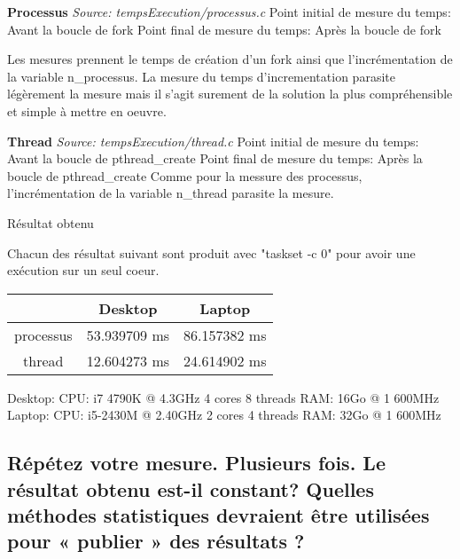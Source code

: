 \documentclass[12pt]{article}
\begin{document}
		\textbf{Processus}\newline
		\textit{Source: tempsExecution/processus.c} \newline
		Point initial de mesure du temps: Avant la boucle de fork \newline
		Point final de mesure du temps: Après la boucle de fork \newline
		\newline

		Les mesures prennent le temps de création d'un fork ainsi que l'incrémentation
		de la variable n\_processus. La mesure du temps d'incrementation parasite
		légèrement la mesure mais il s'agit surement de la solution la plus
		compréhensible et simple à mettre en oeuvre.\newline
		\newline

		\textbf{Thread}\newline
		\textit{Source: tempsExecution/thread.c}\newline
		Point initial de mesure du temps: Avant la boucle de pthread\_create\newline
		Point final de mesure du temps: Après la boucle de pthread\_create\newline
		\newline
		Comme pour la messure des processus, l'incrémentation de la variable
		n\_thread parasite la mesure.\newline

		Résultat obtenu

		Chacun des résultat suivant sont produit avec "taskset -c 0" pour avoir
		une exécution sur un seul coeur.

		\begin{center}
		  \begin{tabular}{ | c | c | c | }
				\hline
					&	Desktop      &    Laptop \\
				\hline
					processus & 53.939709 ms  &     86.157382 ms \\
				\hline
					thread    & 12.604273 ms  &      24.614902 ms \\
				\hline
			\end{tabular}
		\end{center}

		Desktop: CPU: i7 4790K @ 4.3GHz 4 cores 8 threads RAM: 16Go @ 1 600MHz
		Laptop: CPU: i5-2430M @ 2.40GHz 2 cores 4 threads RAM: 32Go @ 1 600MHz

	\subsection{Répétez votre mesure. Plusieurs fois. Le résultat obtenu est-il constant? Quelles méthodes statistiques devraient être utilisées pour « publier » des résultats ?}
\end{document}
